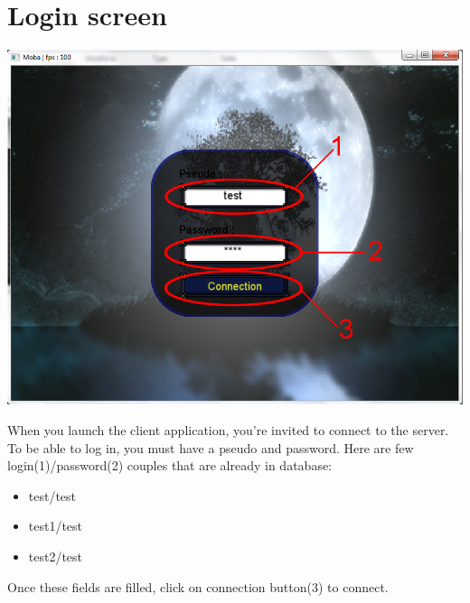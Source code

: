 \documentclass{scrreprt}
\begin{document}
			  \section{Login screen}
			  \begin{center}
			  \includegraphics[scale=0.4]{connection_screen.png}
			  \end{center}
			  When you launch the client application, you're invited to connect to the server. To be able to log in, you must have a pseudo and password. Here are few login(1)/password(2) couples that are already in database:
			  \begin{itemize}
			  \item{test/test}
			  \item{test1/test}
			  \item{test2/test}
			  \end{itemize}

			  Once these fields are filled, click on connection button(3) to connect.
\end{document}
